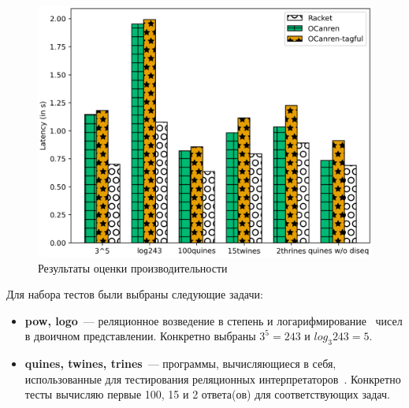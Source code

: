 \begin{figure}[t]
\centering
\includegraphics[scale=0.8]{graph.png}
\caption{Результаты оценки производительности}
\label{eval}
\end{figure}

\FloatBarrier

Для набора тестов были выбраны следующие задачи:

\begin{itemize}
\item \textbf{pow, logo}~--- реляционное возведение в степень и логарифмирование~\cite{KiselyovArithm} чисел в двоичном представлении.
Конкретно выбраны $3^5=243$ и $log_3 243=5$.
\item \textbf{quines, twines, trines}~--- программы, вычисляющиеся в себя, использованные для тестирования реляционных интерпретаторов~\cite{Untagged}.
Конкретно тесты вычисляю первые 100, 15 и 2 ответа(ов) для соответствующих задач.
\end{itemize}


